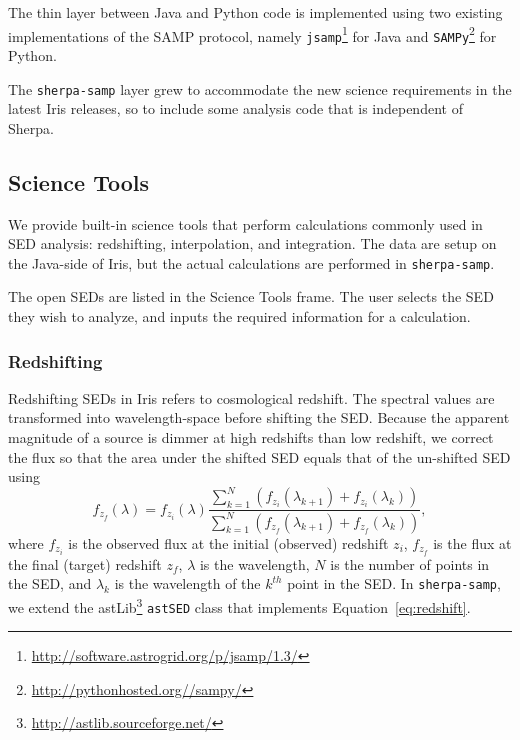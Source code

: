 \documentclass[preprint,authoryear,5p]{elsarticle}
\begin{document}
\begin{sloppypar}
The thin layer between Java and Python code is implemented using two existing
implementations of the SAMP protocol, namely
\verb|jsamp|\footnote{\url{http://software.astrogrid.org/p/jsamp/1.3/}} for Java and
\verb|SAMPy|\footnote{\url{http://pythonhosted.org//sampy/}} for Python.
\end{sloppypar}

The \verb|sherpa-samp| layer grew to accommodate the new science requirements in
the latest Iris releases, so to include some analysis code that is
independent of Sherpa.

%

\subsection{Science Tools} We provide built-in science tools that perform
calculations commonly used in SED analysis: redshifting, interpolation, and
integration. The data are setup on the Java-side of Iris, but the actual
calculations are performed in \verb|sherpa-samp|.

The open SEDs are listed in the Science Tools frame. The user selects the SED
they wish to analyze, and inputs the required information for a calculation.

\subsubsection{Redshifting} Redshifting SEDs in Iris refers to cosmological
redshift. The spectral values are transformed into wavelength-space before 
shifting the SED.
Because the apparent magnitude of a source is dimmer at high redshifts
than low redshift, we correct the flux so that the area under the shifted SED
equals that of the un-shifted SED using
\begin{equation} \label{eq:redshift} f_{z_{f}}(\lambda) = f_{z_{i}}(\lambda)
\frac{\sum_{k=1}^N
(f_{z_{i}}(\lambda_{k+1})+f_{z_{i}}(\lambda_{k}))}{\sum_{k=1}^N
(f_{z_{f}}(\lambda_{k+1})+f_{z_{f}}(\lambda_{k}))}, \end{equation}
where $f_{z_i}$ is the observed flux at the initial (observed) redshift $z_i$,
$f_{z_f}$ is the flux at the final (target) redshift $z_f$, ${\lambda}$ is the
wavelength, $N$ is the number of points in the SED, and $\lambda_{k}$ is the wavelength
of the $k^{th}$ point in the SED. In \verb|sherpa-samp|, we extend the
astLib\footnote{\url{http://astlib.sourceforge.net/}} \texttt{astSED} class that
implements Equation~\ref{eq:redshift}.
\end{document}
